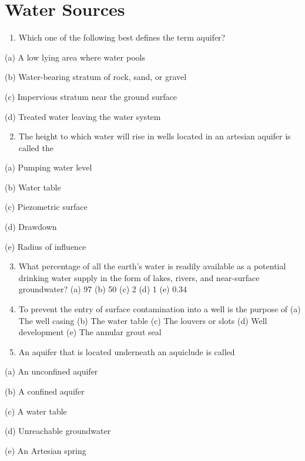 \documentclass[10pt]{article}
\begin{document}
\section{Water Sources}
\begin{enumerate}
  \item Which one of the following best defines the term aquifer?
\end{enumerate}

(a) A low lying area where water pools

(b) Water-bearing stratum of rock, sand, or gravel

(c) Impervious stratum near the ground surface

(d) Treated water leaving the water system

\begin{enumerate}
  \setcounter{enumi}{1}
  \item The height to which water will rise in wells located in an artesian aquifer is called the
\end{enumerate}

(a) Pumping water level

(b) Water table

(c) Piezometric surface

(d) Drawdown

(e) Radius of influence

\begin{enumerate}
  \setcounter{enumi}{2}
  \item What percentage of all the earth's water is readily available as a potential drinking water supply in the form of lakes, rivers, and near-surface groundwater?
(a) 97
(b) 50
(c) 2
(d) 1
(e) $0.34$

  \item To prevent the entry of surface contamination into a well is the purpose of
(a) The well casing
(b) The water table
(c) The louvers or slots
(d) Well development (e) The annular grout seal

  \item An aquifer that is located underneath an aquiclude is called

\end{enumerate}

(a) An unconfined aquifer

(b) A confined aquifer

(c) A water table

(d) Unreachable groundwater

(e) An Artesian spring
\end{document}
